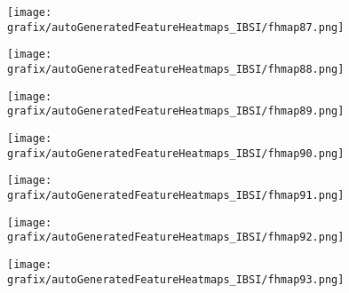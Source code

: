 \hspace{\hsp} 
\begin{subfigure}{\wid\textwidth} 
    \centering 
    \caption{\tiny \sffamily {}} 
    \vspace{\vsp} 
    \texttt{[image: grafix/autoGeneratedFeatureHeatmaps\_IBSI/fhmap87.png]} 
\end{subfigure} 
\hspace{\hsp} 
\begin{subfigure}{\wid\textwidth} 
    \centering 
    \caption{\tiny \sffamily {}} 
    \vspace{\vsp} 
    \texttt{[image: grafix/autoGeneratedFeatureHeatmaps\_IBSI/fhmap88.png]} 
\end{subfigure} 
\hspace{\hsp} 
\begin{subfigure}{\wid\textwidth} 
    \centering 
    \caption{\tiny \sffamily {}} 
    \vspace{\vsp} 
    \texttt{[image: grafix/autoGeneratedFeatureHeatmaps\_IBSI/fhmap89.png]} 
\end{subfigure} 
\hspace{\hsp} 
\begin{subfigure}{\wid\textwidth} 
    \centering 
    \caption{\tiny \sffamily {}} 
    \vspace{\vsp} 
    \texttt{[image: grafix/autoGeneratedFeatureHeatmaps\_IBSI/fhmap90.png]} 
\end{subfigure} 
\hspace{\hsp} 
\begin{subfigure}{\wid\textwidth} 
    \centering 
    \caption{\tiny \sffamily {}} 
    \vspace{\vsp} 
    \texttt{[image: grafix/autoGeneratedFeatureHeatmaps\_IBSI/fhmap91.png]} 
\end{subfigure} 
\hspace{\hsp} 
\begin{subfigure}{\wid\textwidth} 
    \centering 
    \caption{\tiny \sffamily {}} 
    \vspace{\vsp} 
    \texttt{[image: grafix/autoGeneratedFeatureHeatmaps\_IBSI/fhmap92.png]} 
\end{subfigure} 
\hspace{\hsp} 
\begin{subfigure}{\wid\textwidth} 
    \centering 
    \caption{\tiny \sffamily {}} 
    \vspace{\vsp} 
    \texttt{[image: grafix/autoGeneratedFeatureHeatmaps\_IBSI/fhmap93.png]} 
\end{subfigure} 

